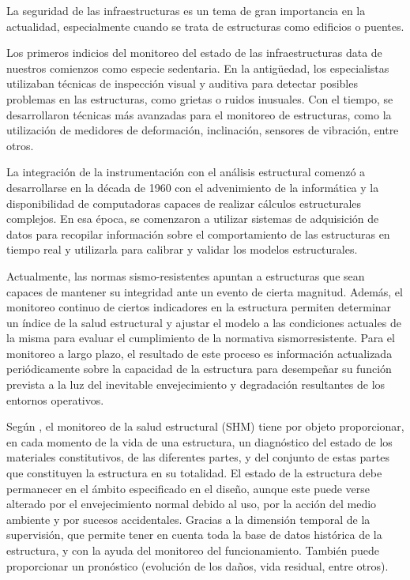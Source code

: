 La seguridad de las infraestructuras es un tema de gran importancia en la actualidad, especialmente cuando se trata de estructuras como edificios o puentes.

Los primeros indicios del monitoreo del estado de las infraestructuras data de nuestros comienzos como especie sedentaria.  En la antigüedad, los especialistas utilizaban técnicas de inspección visual y auditiva para detectar posibles problemas en las estructuras, como grietas o ruidos inusuales. Con el tiempo, se desarrollaron técnicas más avanzadas para el monitoreo de estructuras, como la utilización de medidores de deformación, inclinación, sensores de vibración, entre otros.

La integración de la instrumentación con el análisis estructural comenzó a desarrollarse en la década de 1960 con el advenimiento de la informática y la disponibilidad de computadoras capaces de realizar cálculos estructurales complejos. En esa época, se comenzaron a utilizar sistemas de adquisición de datos para recopilar información sobre el comportamiento de las estructuras en tiempo real y utilizarla para calibrar y validar los modelos estructurales.

Actualmente, las normas sismo-resistentes apuntan a estructuras que sean capaces de mantener su integridad ante un evento de cierta magnitud. Además, el monitoreo continuo de ciertos indicadores en la estructura permiten determinar un índice de la salud estructural y ajustar el modelo a las condiciones actuales de la misma para evaluar el cumplimiento de la normativa sismorresistente. Para el monitoreo a largo plazo, el resultado de este proceso es información actualizada periódicamente sobre la capacidad de la estructura para desempeñar su función prevista a la luz del inevitable envejecimiento y degradación resultantes de los entornos operativos.

Según \cite{balageas2010structural}, el monitoreo de la salud estructural (SHM) tiene por objeto proporcionar, en cada momento de la vida de una estructura, un diagnóstico del estado de los materiales constitutivos, de las diferentes
partes, y del conjunto de estas partes que constituyen la estructura en su totalidad. El estado de la estructura debe permanecer en el ámbito especificado en el diseño, aunque este puede verse alterado por el envejecimiento normal debido al uso, por la acción del medio ambiente y por sucesos accidentales. Gracias a la dimensión temporal de la supervisión, que permite tener en cuenta toda la base de datos histórica de la estructura, y con la ayuda del monitoreo del funcionamiento. También puede proporcionar un pronóstico (evolución de los daños, vida residual, entre otros).

